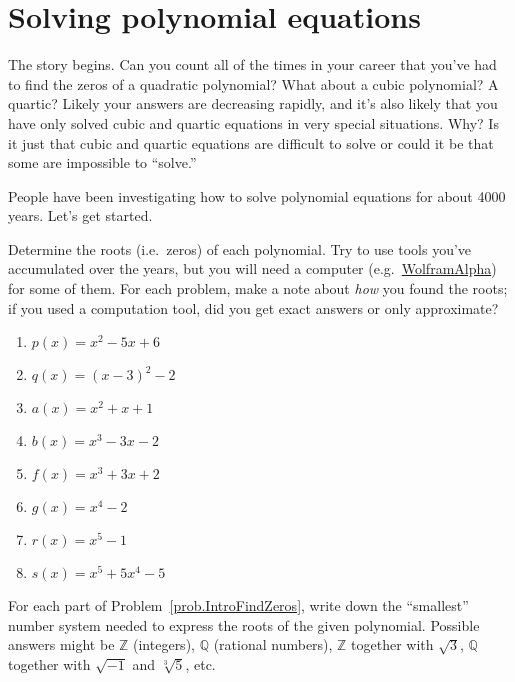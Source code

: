 \chapter{Solving polynomial equations}
\label{chapter:PolyEquations}
\thispagestyle{empty}

The story begins. Can you count all of the times in your career that you've had to find the zeros of a quadratic polynomial? What about a cubic polynomial? A quartic? Likely your answers are decreasing rapidly, and it's also likely that you have only solved cubic and quartic equations in very special situations. Why? Is it just that cubic and quartic equations are difficult to solve or could it be that some are impossible to ``solve.'' 

People have been investigating how to solve polynomial equations for about 4000 years. Let's get started.

\begin{problem}\label{prob.IntroFindZeros}
Determine the roots (i.e.~zeros) of each polynomial. Try to use tools you've accumulated over the years, but you will need a computer  (e.g.~\href{https://www.wolframalpha.com}{WolframAlpha}) for some of them. For each problem, make a note about \emph{how} you found the roots; if you used a computation tool, did you get exact answers or only approximate?
\begin{multicols}{2}
\begin{enumerate}
\item $p(x) = x^2 - 5x + 6$
\item $q(x) = (x-3)^2 - 2$
\item $a(x) = x^2 + x + 1$
\item $b(x) = x^3-3x-2$ %
\item $f(x) =  x^3+3x+2$ %
\item $g(x) = x^4 - 2$
\item $r(x) = x^5 - 1$
\item $s(x) = x^5 +5 x^4-5$ %
\end{enumerate}
\end{multicols}
\end{problem}

\begin{problem}\label{prob.IntroFindZerosWhere}
For each part of Problem~\ref{prob.IntroFindZeros}, write down the ``smallest'' number system needed to express the roots of the given polynomial. Possible answers might be $\mathbb{Z}$ (integers), $\mathbb{Q}$ (rational numbers), $\mathbb{Z}$ together with $\sqrt{3}$, $\mathbb{Q}$ together with $\sqrt{-1}$ and $\sqrt[3]{5}$, etc.
\end{problem}

